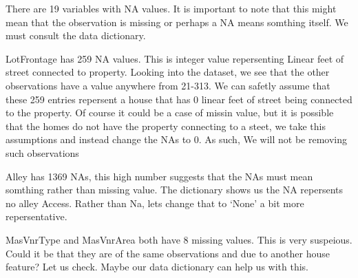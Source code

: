\documentclass[]{article}
\newenvironment{Shaded}{\begin{snugshade}}{\end{snugshade}}
\newcommand{\KeywordTok}[1]{\textcolor[rgb]{0.13,0.29,0.53}{\textbf{#1}}}
\newcommand{\DecValTok}[1]{\textcolor[rgb]{0.00,0.00,0.81}{#1}}
\newcommand{\StringTok}[1]{\textcolor[rgb]{0.31,0.60,0.02}{#1}}
\newcommand{\ControlFlowTok}[1]{\textcolor[rgb]{0.13,0.29,0.53}{\textbf{#1}}}
\newcommand{\OperatorTok}[1]{\textcolor[rgb]{0.81,0.36,0.00}{\textbf{#1}}}
\newcommand{\NormalTok}[1]{#1}
\begin{document}
There are 19 variables with NA values. It is important to note that this
might mean that the observation is missing or perhaps a NA means
somthing itself. We must consult the data dictionary.

LotFrontage has 259 NA values. This is integer value repersenting Linear
feet of street connected to property. Looking into the dataset, we see
that the other observations have a value anywhere from 21-313. We can
safetly assume that these 259 entries repersent a house that has 0
linear feet of street being connected to the property. Of course it
could be a case of missin value, but it is possible that the homes do
not have the property connecting to a steet, we take this assumptions
and instead change the NAs to 0. As such, We will not be removing such
observations

\begin{Shaded}
\end{Shaded}

Alley has 1369 NAs, this high number suggests that the NAs must mean
somthing rather than missing value. The dictionary shows us the NA
repersents no alley Access. Rather than Na, lets change that to `None' a
bit more repersentative.

\begin{Shaded}
\end{Shaded}

MasVnrType and MasVnrArea both have 8 missing values. This is very
suspeious. Could it be that they are of the same observations and due to
another house feature? Let us check. Maybe our data dictionary can help
us with this.
\end{document}
